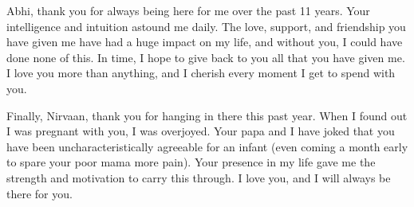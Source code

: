 Abhi, thank you for always being here for me over the past 11 years. Your intelligence and intuition astound me daily. The love, support, and friendship you have given me have had a huge impact on my life, and without you, I could have done none of this. In time, I hope to give back to you all that you have given me. I love you more than anything, and I cherish every moment I get to spend with you. 

Finally, Nirvaan, thank you for hanging in there this past year. When I found out I was pregnant with you, I was overjoyed. Your papa and I have joked that you have been uncharacteristically agreeable for an infant (even coming a month early to spare your poor mama more pain). Your presence in my life gave me the strength and motivation to carry this through. I love you, and I will always be there for you. 
